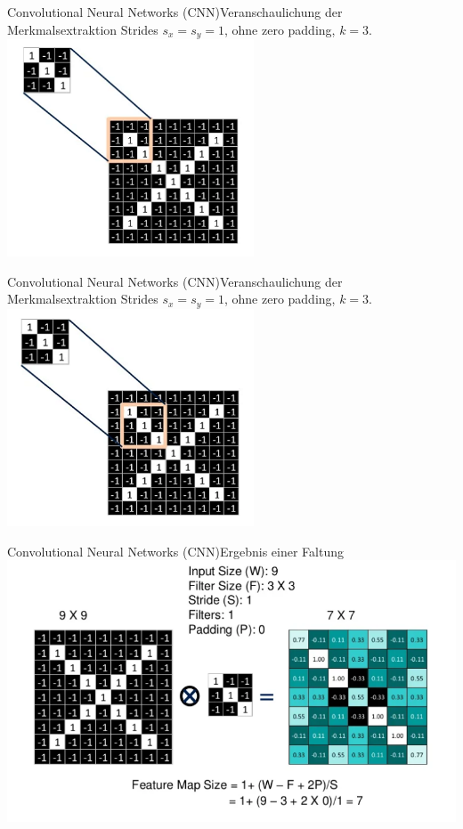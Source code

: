 \documentclass[10pt]{beamer} %
\begin{document}
\begin{frame}{Convolutional Neural Networks (CNN)}{Veranschaulichung der Merkmalsextraktion}
   Strides $s_x=s_y=1$, ohne zero padding, $k=3$.
\includegraphics[width=0.55\textwidth]{pics/1window.png}
\end{frame}


\begin{frame}{Convolutional Neural Networks (CNN)}{Veranschaulichung der Merkmalsextraktion}
   Strides $s_x=s_y=1$, ohne zero padding, $k=3$.
\includegraphics[width=0.55\textwidth]{pics/4window.png}
\end{frame}

\begin{frame}{Convolutional Neural Networks (CNN)}{Ergebnis einer Faltung}
   \includegraphics[width=1\textwidth]{pics/sum_cnn.png}
\end{frame}
\end{document}
